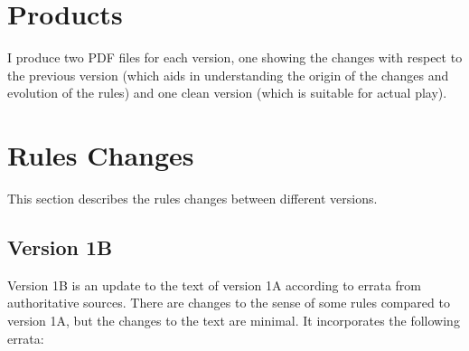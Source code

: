 \documentclass[10pt]{report}
\begin{document}
\section{Products}

I produce two PDF files for each version, one showing the changes with respect to the previous version (which aids in understanding the origin of the changes and evolution of the rules) and one clean version (which is suitable for actual play).



\section{Rules Changes}

This section describes the rules changes between different versions.

\subsection{Version 1B}

Version 1B is an update to the text of version 1A according to errata from authoritative sources. There are changes to the sense of some rules compared to version 1A, but the changes to the text are minimal. It incorporates the following errata:
\end{document}

